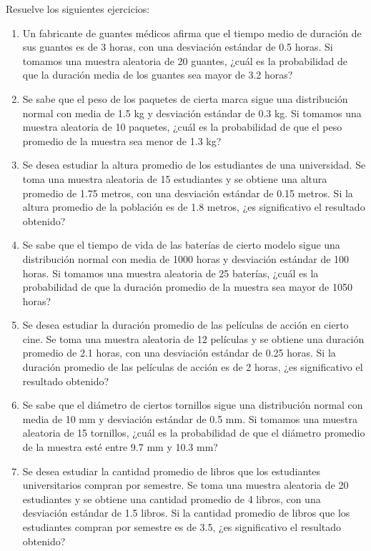 \begin{Ejer}
Resuelve los siguientes ejercicios:

\begin{enumerate}
    \item Un fabricante de guantes médicos afirma que el tiempo medio de duración de sus guantes es de 3 horas, con una desviación estándar de 0.5 horas. Si tomamos una muestra aleatoria de 20 guantes, ¿cuál es la probabilidad de que la duración media de los guantes sea mayor de 3.2 horas?

    \item Se sabe que el peso de los paquetes de cierta marca sigue una distribución normal con media de 1.5 kg y desviación estándar de 0.3 kg. Si tomamos una muestra aleatoria de 10 paquetes, ¿cuál es la probabilidad de que el peso promedio de la muestra sea menor de 1.3 kg?

    \item Se desea estudiar la altura promedio de los estudiantes de una universidad. Se toma una muestra aleatoria de 15 estudiantes y se obtiene una altura promedio de 1.75 metros, con una desviación estándar de 0.15 metros. Si la altura promedio de la población es de 1.8 metros, ¿es significativo el resultado obtenido?

    \item Se sabe que el tiempo de vida de las baterías de cierto modelo sigue una distribución normal con media de 1000 horas y desviación estándar de 100 horas. Si tomamos una muestra aleatoria de 25 baterías, ¿cuál es la probabilidad de que la duración promedio de la muestra sea mayor de 1050 horas?

    \item Se desea estudiar la duración promedio de las películas de acción en cierto cine. Se toma una muestra aleatoria de 12 películas y se obtiene una duración promedio de 2.1 horas, con una desviación estándar de 0.25 horas. Si la duración promedio de las películas de acción es de 2 horas, ¿es significativo el resultado obtenido?

    \item Se sabe que el diámetro de ciertos tornillos sigue una distribución normal con media de 10 mm y desviación estándar de 0.5 mm. Si tomamos una muestra aleatoria de 15 tornillos, ¿cuál es la probabilidad de que el diámetro promedio de la muestra esté entre 9.7 mm y 10.3 mm?

    \item Se desea estudiar la cantidad promedio de libros que los estudiantes universitarios compran por semestre. Se toma una muestra aleatoria de 20 estudiantes y se obtiene una cantidad promedio de 4 libros, con una desviación estándar de 1.5 libros. Si la cantidad promedio de libros que los estudiantes compran por semestre es de 3.5, ¿es significativo el resultado obtenido?


\end{enumerate}
\end{Ejer}

